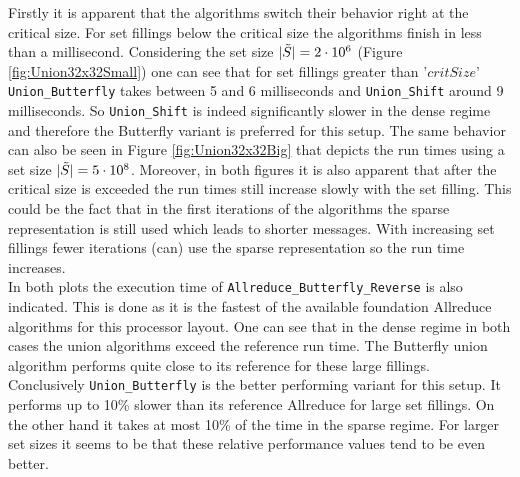 Firstly it is apparent that the algorithms switch their behavior right at the critical size. For set fillings below the critical size the algorithms finish in less than a millisecond. Considering the set size $|\Tilde{S}| = 2\cdot 10^6$ (Figure \ref{fig:Union32x32Small}) one can see that for set fillings greater than '$critSize$' \texttt{Union\_Butterfly} takes between 5 and 6 milliseconds and \texttt{Union\_Shift} around 9 milliseconds. So \texttt{Union\_Shift} is indeed significantly slower in the dense regime and therefore the Butterfly variant is preferred for this setup. The same behavior can also be seen in Figure \ref{fig:Union32x32Big} that depicts the run times using a set size $|\Tilde{S}| = 5\cdot 10^8$. Moreover, in both figures it is also apparent that after the critical size is exceeded the run times still increase slowly with the set filling. This could be the fact that in the first iterations of the algorithms the sparse representation is still used which leads to shorter messages. With increasing set fillings fewer iterations (can) use the sparse representation so the run time increases.\\
In both plots the execution time of \texttt{All\-re\-duce\_But\-ter\-fly\_Reverse} is also indicated. This is done as it is the fastest of the available foundation Allreduce algorithms for this processor layout. One can see that in the dense regime in both cases the union algorithms exceed the reference run time. The Butterfly union  algorithm performs quite close to its reference for these large fillings.\\
Conclusively \texttt{Union\_Butterfly} is the better performing variant for this setup. It performs up to 10\% slower than its reference Allreduce for large set fillings. On the other hand it takes at most 10\% of the time in the sparse regime. For larger set sizes it seems to be that these relative performance values tend to be even better.

